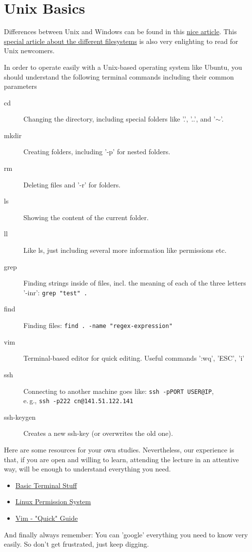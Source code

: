 \section{Unix Basics}
\label{sec:LinuxBasics}

Differences between Unix and Windows can be found in this \href{https://www.techrepublic.com/blog/10-things/10-fundamental-differences-between-linux-and-windows/}{nice article}. This \href{https://www.howtogeek.com/137096/6-ways-the-linux-file-system-is-different-from-the-windows-file-system/}{special article about the different filesystems} is also very enlighting to read for Unix newcomers.

In order to operate easily with a Unix-based operating system like Ubuntu, you should understand the following terminal commands including their common parameters 

\begin{description}
\item [cd] Changing the directory, including special folders like '.', '..', and '$\sim$'.
\item [mkdir] Creating folders, including '-p' for nested folders.
\item [rm] Deleting files and '-r' for folders.
\item [ls] Showing the content of the current folder.
\item [ll] Like ls, just including several more information like permissions etc.
\item [grep] Finding strings inside of files, incl. the meaning of each of the three letters '-inr': \verb#grep "test" .# 
\item [find] Finding files: \verb#find . -name "regex-expression"#
\item [vim] Terminal-based editor for quick editing. Useful commands ':wq', 'ESC', 'i'
\item [ssh] Connecting to another machine goes like: \verb#ssh -pPORT USER@IP#,\\e.\,g., \verb#ssh -p222 cn@141.51.122.141#
\item [ssh-keygen] Creates a new ssh-key (or overwrites the old one).
\end{description}

Here are some resources for your own studies. Nevertheless, our experience is that, if you are open and willing to learn, attending the lecture in an attentive way, will be enough to understand everything you need.
\begin{itemize}
\item \href{https://www.digitalocean.com/community/tutorials/an-introduction-to-linux-basics}{Basic Terminal Stuff}
\item \href{https://www.digitalocean.com/community/tutorials/linux-permissions-basics-and-how-to-use-umask-on-a-vps}{Linux Permission System}
\item \href{https://www.tutorialspoint.com/vim/vim_quick_guide.htm}{Vim - "Quick" Guide}
\end{itemize}

And finally always remember: You can 'google' everything you need to know very easily. So don't get frustrated, just keep digging.
